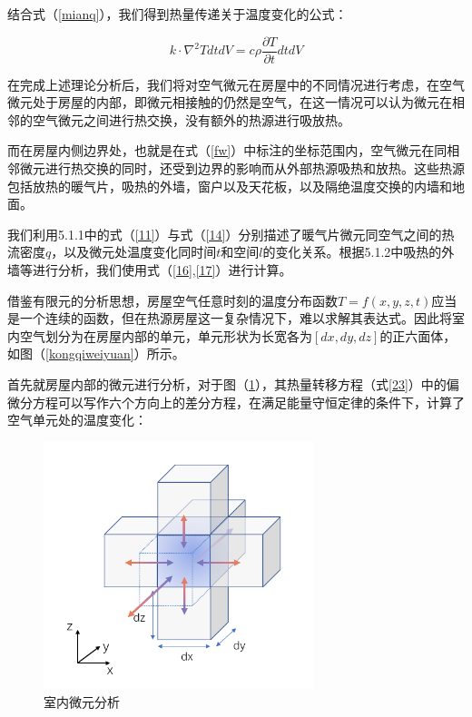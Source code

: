 \documentclass{my_paper}
\begin{document}
结合式（\ref{mianq}），我们得到热量传递关于温度变化的公式：

\begin{equation}
    k\cdot \nabla^2 T dtdV = c\rho \frac{\partial T}{\partial t}dtdV
\label{}
\end{equation}

在完成上述理论分析后，我们将对空气微元在房屋中的不同情况进行考虑，在空气微元处于房屋的内部，即微元相接触的仍然是空气，在这一情况可以认为微元在相邻的空气微元之间进行热交换，没有额外的热源进行吸放热。

而在房屋内侧边界处，也就是在式（\ref{fw}）中标注的坐标范围内，空气微元在同相邻微元进行热交换的同时，还受到边界的影响而从外部热源吸热和放热。这些热源包括放热的暖气片，吸热的外墙，窗户以及天花板，以及隔绝温度交换的内墙和地面。

我们利用5.1.1中的式（\ref{11}）与式（\ref{14}）分别描述了暖气片微元同空气之间的热流密度$q$，以及微元处温度变化同时间$t$和空间$l$的变化关系。根据5.1.2中吸热的外墙等进行分析，我们使用式（\ref{16},\ref{17}）进行计算。


借鉴有限元\cite{4}的分析思想，房屋空气任意时刻的温度分布函数$T = f(x,y,z,t)$应当是一个连续的函数，但在热源房屋这一复杂情况下，难以求解其表达式。因此将室内空气划分为在房屋内部的单元，单元形状为长宽各为$[dx,dy,dz]$的正六面体，如图（\ref{kongqiweiyuan}）所示。


首先就房屋内部的微元进行分析，对于图（\ref{wya}），其热量转移方程（式\ref{23}）中的偏微分方程可以写作六个方向上的差分方程，在满足能量守恒定律的条件下，计算了空气单元处的温度变化：

\begin {figure}[h]
\centering %
\includegraphics[width=0.7\textwidth]{wya.png}
\caption{室内微元分析} %
\label{wya}
\end {figure}
\end{document}
